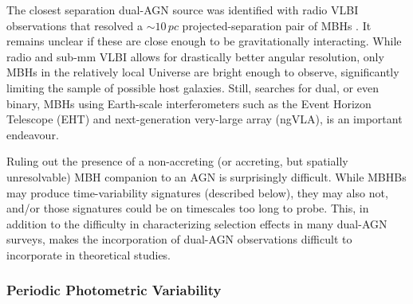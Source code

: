 \documentclass[onecolumn,authoryear]{els-mrw}
\begin{document}
The closest separation dual-AGN source was identified with radio VLBI observations that resolved a $\sim 10 \, pc$ projected-separation pair of MBHs \citep{Rodriguez+2006}.  It remains unclear if these are close enough to be gravitationally interacting.  While radio and sub-mm VLBI allows for drastically better angular resolution, only MBHs in the relatively local Universe are bright enough to observe, significantly limiting the sample of possible host galaxies.  Still, searches for dual, or even binary, MBHs using Earth-scale interferometers such as the Event Horizon Telescope (EHT) and next-generation very-large array (ngVLA), is an important endeavour.

Ruling out the presence of a non-accreting (or accreting, but spatially unresolvable) MBH companion to an AGN is surprisingly difficult.  While MBHBs may produce time-variability signatures (described below), they may also not, and/or those signatures could be on timescales too long to probe.  This, in addition to the difficulty in characterizing selection effects in many dual-AGN surveys, makes the incorporation of dual-AGN observations difficult to incorporate in theoretical studies.

\subsubsection{Periodic Photometric Variability}
\end{document}
